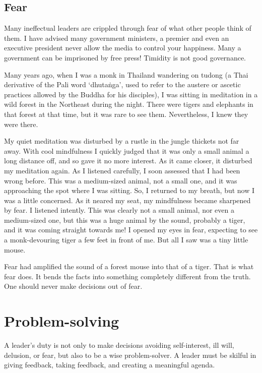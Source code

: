 \documentclass[11pt, openany]{book}
\begin{document}
\section{Fear}

Many ineffectual leaders are crippled through fear of what other people think of them. I have advised many government ministers, a premier and even an executive president never allow the media to control your happiness. Many a government can be imprisoned by free press! Timidity is not good governance.

Many years ago, when I was a monk in Thailand wandering on tudong (a Thai derivative of the Pali word ‘dhutaṅga’, used to refer to the austere or ascetic practices allowed by the Buddha for his disciples), I was sitting in meditation in a wild forest in the Northeast during the night. There were tigers and elephants in that forest at that time, but it was rare to see them. Nevertheless, I knew they were there.

My quiet meditation was disturbed by a rustle in the jungle thickets not far away. With cool mindfulness I quickly judged that it was only a small animal a long distance off, and so gave it no more interest. As it came closer, it disturbed my meditation again. As I listened carefully, I soon assessed that I had been wrong before. This was a medium-sized animal, not a small one, and it was approaching the spot where I was sitting. So, I returned to my breath, but now I was a little concerned. As it neared my seat, my mindfulness became sharpened by fear. I listened intently. This was clearly not a small animal, nor even a medium-sized one, but this was a huge animal by the sound, probably a tiger, and it was coming straight towards me! I opened my eyes in fear, expecting to see a monk-devouring tiger a few feet in front of me. But all I saw was a tiny little mouse.

Fear had amplified the sound of a forest mouse into that of a tiger. That is what fear does. It bends the facts into something completely different from the truth. One should never make decisions out of fear.

\chapter{Problem-solving}

A leader’s duty is not only to make decisions avoiding self-interest, ill will, delusion, or fear, but also to be a wise problem-solver. A leader must be skilful in giving feedback, taking feedback, and creating a meaningful agenda.
\end{document}
